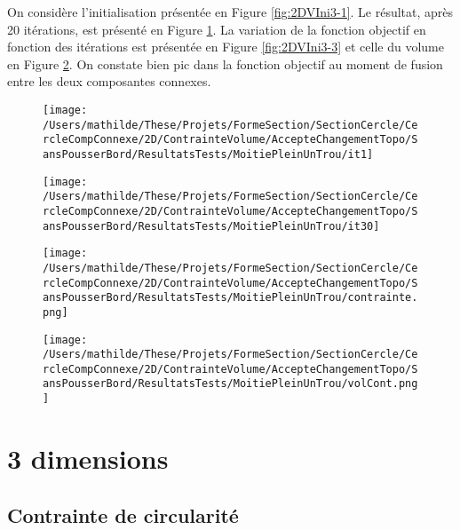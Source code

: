\documentclass[11pt,a4paper]{article}
\begin{document}
On considère l'initialisation présentée en Figure \ref{fig:2DVIni3-1}. Le résultat, après 20 itérations, est présenté en Figure \ref{fig:2DVIni3-2}. La variation de la fonction objectif en fonction des itérations est présentée en Figure \ref{fig:2DVIni3-3} et celle du volume en Figure \ref{fig:2DVIni3-4}. On constate bien pic dans la fonction objectif au moment de fusion entre les deux composantes connexes.

\begin{figure}[H]
	\begin{minipage}{0.48\textwidth}
		\centering
		\texttt{[image: /Users/mathilde/These/Projets/FormeSection/SectionCercle/CercleCompConnexe/2D/ContrainteVolume/AccepteChangementTopo/SansPousserBord/ResultatsTests/MoitiePleinUnTrou/it1]}
		\label{fig:2DVIni3-1}
	\end{minipage}
	\begin{minipage}{0.48\textwidth}
		\centering
		\texttt{[image: /Users/mathilde/These/Projets/FormeSection/SectionCercle/CercleCompConnexe/2D/ContrainteVolume/AccepteChangementTopo/SansPousserBord/ResultatsTests/MoitiePleinUnTrou/it30]}
		\label{fig:2DVIni3-2}
	\end{minipage}
\end{figure}

\begin{figure}[H]
	\begin{minipage}{0.48\textwidth}
		\centering
		\texttt{[image: /Users/mathilde/These/Projets/FormeSection/SectionCercle/CercleCompConnexe/2D/ContrainteVolume/AccepteChangementTopo/SansPousserBord/ResultatsTests/MoitiePleinUnTrou/contrainte.png]}
		\label{fig:2DVIni3-3}
	\end{minipage}
	\begin{minipage}{0.48\textwidth}
		\centering
		\texttt{[image: /Users/mathilde/These/Projets/FormeSection/SectionCercle/CercleCompConnexe/2D/ContrainteVolume/AccepteChangementTopo/SansPousserBord/ResultatsTests/MoitiePleinUnTrou/volCont.png]}
		\label{fig:2DVIni3-4}
	\end{minipage}
\end{figure}




\section{3 dimensions}

\subsection{Contrainte de circularité}
\end{document}
